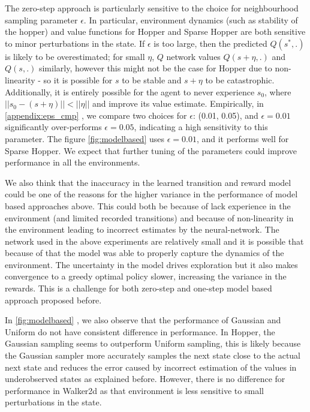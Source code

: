 \documentclass[11pt,a4paper]{report}
\begin{document}
The zero-step approach is particularly sensitive to the choice for neighbourhood sampling parameter $\epsilon$. In particular, environment dynamics (such as stability of the hopper) and value functions for Hopper and Sparse Hopper are both sensitive to minor perturbations in the state. If $\epsilon$ is too large, then the predicted $Q(s^*, .)$ is likely to be overestimated; for small $\eta$, $Q$ network values $Q(s + \eta, .)$ and $Q(s, .)$ similarly, however this might not be the case for Hopper due to non-linearity - so it is possible for $s$ to be stable and $s + \eta$ to be catastrophic. Additionally, it is entirely possible for the agent to never experience $s_0$, where $||s_0 - (s+\eta)|| < ||\eta||$ and improve its value estimate. Empirically, in \ref{appendix:eps_cmp} , we compare two choices for $\epsilon$: (0.01, 0.05), and $\epsilon = 0.01$ significantly over-performs $\epsilon = 0.05$, indicating a high sensitivity to this parameter. The figure \ref{fig:modelbased} uses $\epsilon = 0.01$, and it performs well for Sparse Hopper. We expect that further tuning of the parameters could improve performance in all the environments. \par

We also think that the inaccuracy in the learned transition and reward model could be one of the reasons for the higher variance in the performance of model based approaches above. This could both be because of lack experience in the environment (and limited recorded transitions) and because of non-linearity in the environment leading to incorrect estimates by the neural-network. The network used in the above experiments are relatively small and it is possible that because of that the model was able to properly capture the dynamics of the environment. The uncertainty in the model drives exploration but it also makes convergence to a greedy optimal policy slower, increasing the variance in the rewards. This is a challenge for both zero-step and one-step model based approach proposed before. 
\par 
In \ref{fig:modelbased} , we also observe that the performance of Gaussian and Uniform do not have consistent difference in performance. In Hopper, the Gaussian sampling seems to outperform Uniform sampling, this is likely because the Gaussian sampler more accurately samples the next state close to the actual next state and reduces the error caused by incorrect estimation of the values in underobserved states as explained before. However, there is no difference for performance in Walker2d as that environment is less sensitive to small perturbations in the state. 
\end{document}
